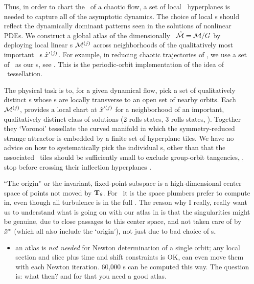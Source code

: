 Thus, in order to chart the \statesp\ of a chaotic flow, a set
of local \slice\ hyperplanes is needed to capture all of the asymptotic
dynamics. The choice of local \slice s should reflect the dynamically
dominant patterns seen in the solutions of nonlinear PDEs. We construct a
global atlas of the dimensionally \reducedsp\ $\hat{\cal M} = {\cal M}/G$ by
deploying local linear \slice s  ${\cal M}{}^{(j)}$ across neighborhoods of
the qualitatively most important \template\ {\cohStr s}
${\hat{x}'}{}^{(j)}$. For example, in reducing chaotic trajectories of
, we use a set of \reqva\ as our \template s, see
. This is the periodic-orbit implementation of the
idea of {\statesp\ tessellation}.

The physical task is to, for a given dynamical flow, pick a set of
qualitatively distinct {\template s} whose \slice s  are locally
transverse to an open set of nearby orbits. Each \slice\ ${\cal M}{}^{(j)}$,
provides a local chart at ${\hat{x}'}{}^{(j)}$ for a neighborhood of an
important, qualitatively distinct class of solutions (2-rolls states,
3-rolls states, \etc). Together they `Voronoi' tessellate  the curved
manifold in which the symmetry-reduced strange attractor is embedded by a
finite set of hyperplane tiles. We have no advice on how to
systematically pick the individual \template s, other than that the
associated \slice\ tiles should be sufficiently small to exclude
group-orbit tangencies, \ie, stop before crossing their inflection
hyperplanes .

    \ifdraft\color{blue}
``The origin'' or the invariant, fixed-point subspace is a
high-dimensional center space of points not moved by $\mathbf{T}_{\theta}$. For
\pCf\ it is the space plumbers prefer to compute in, even though all
turbulence is in the full \statesp. The reason why I really, really want
us to understand what is going on with our atlas in 
is that the singularities might be genuine, due to close passages to this
center space, and not taken care of by $\hat{x}^\ast$ (which all also
include the `origin'), not just due to bad choice of \template s.
    \color{black}\fi

    \begin{itemize}
      \item an atlas is \emph{not needed} for Newton determination of a
            single orbit; any local section and slice plus time and shift
            constraints is OK, can even move them with each Newton
            iteration. 60,000 \rpo s can be computed this way.
            The question is: what then? and for that you need a good atlas.
    \end{itemize}
